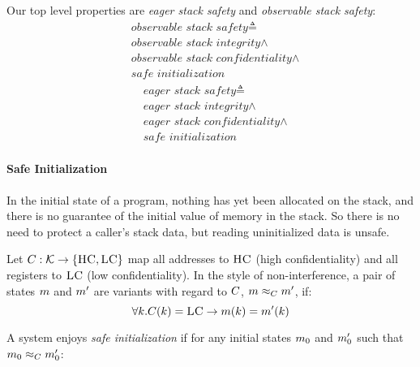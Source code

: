 \documentclass[conference]{IEEEtran}
\begin{document}
    Our top level properties are {\it eager stack safety} and {\it observable stack safety}:
    \[\begin{split}
      & \textit{observable stack safety} \triangleq \\
      & \textit{observable stack integrity} \land \\
      & \textit{observable stack confidentiality} \land \\
      & \textit{safe initialization}
    \end{split}\]
    \[\begin{split}
      & \textit{eager stack safety} \triangleq \\
      & \textit{eager stack integrity} \land \\
      & \textit{eager stack confidentiality} \land \\
      & \textit{safe initialization}
    \end{split}\]


    \paragraph{Safe Initialization}

      In the initial state of a program, nothing has yet been allocated on the stack, and
      there is no guarantee of the initial value of memory in the stack. So there is no
      need to protect a caller's stack data, but reading uninitialized data is unsafe.

      Let \(C : {\mathcal K} \rightarrow \{\textsc{HC},\textsc{LC}\}\) map all addresses
      to \(\textsc{HC}\) (high confidentiality) and all registers to \(\textsc{LC}\)
      (low confidentiality). In the style of non-interference, a pair of states \(m\)
      and \(m'\) are variants with regard to \(C\), \(m \approx_C m'\), if:
      \[\forall k . C(k) = \textsc{LC} \rightarrow m(k) = m'(k)\]
      
      A system enjoys {\it safe initialization} if for any initial states \(m_0\)
      and \(m_0'\) such that \(m_0 \approx_C m_0'\):
\end{document}
